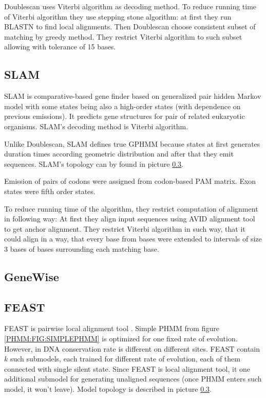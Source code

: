Doublescan uses Viterbi algorithm as decoding method.  To reduce running time of
Viterbi algorithm they use stepping stone algorithm: at first they run BLASTN to
find local alignments. Then Doublescan choose consistent subset of matching by
greedy method. They restrict Viterbi algorithm to such subset allowing with
tolerance of 15 bases.

\subsection{SLAM}

SLAM is comparative-based gene finder \cite{SLAM2003} based on generalized pair
hidden Markov model \cite{Alexanderson2004} with some states being also a
high-order states (with dependence on previous emissions).  It predicts gene
structures for pair of related eukaryotic organisms. SLAM's decoding method is
Viterbi algorithm. 

Unlike Doublescan, SLAM defines true GPHMM because states at first generates
duration times according geometric distribution and after that they emit
sequences. SLAM's topology can by found in picture \ref{}. 

Emission of pairs of codons were assigned from codon-based PAM matrix. Exon
states were fifth order states.

To reduce running time of the algorithm, they restrict computation of alignment
in following way: At first they  align input sequences using AVID alignment
tool\cite{} to get anchor alignment. They restrict Viterbi algorithm in such
way, that it could align  in a way, that every base from  bases were extended to
intervals of size $3$ bases of bases surrounding each matching base.


\subsection{GeneWise}
\subsection{FEAST}
FEAST is pairwise local alignment tool \cite{FEAST2011}. Simple PHMM from figure
\ref{PHMM:FIG:SIMPLEPHMM} is optimized for one fixed rate of evolution. However,
in DNA conservation rate is different on different sites.  FEAST contain $k$
such submodels, each trained for different rate of evolution, each of them
connected with single silent state. Since FEAST is local alignment tool, it
one additional submodel for generating unaligned sequences (once PHMM enters
such model, it won't leave). Model topology is described in picture
\ref{}.


